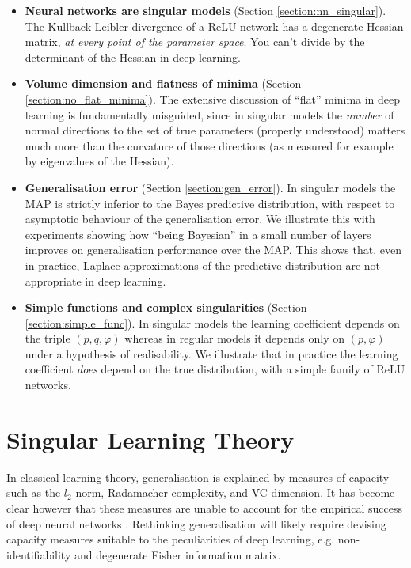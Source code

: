 \documentclass{article} %
\begin{document}
\begin{itemize}
    \item \textbf{Neural networks are singular models} (Section \ref{section:nn_singular}). The Kullback-Leibler divergence of a ReLU network has a degenerate Hessian matrix, \emph{at every point of the parameter space}. You can't divide by the determinant of the Hessian in deep learning.
    \item \textbf{Volume dimension and flatness of minima} (Section \ref{section:no_flat_minima}). The extensive discussion of ``flat'' minima in deep learning is fundamentally misguided, since in singular models the \emph{number} of normal directions to the set of true parameters (properly understood) matters much more than the curvature of those directions (as measured for example by eigenvalues of the Hessian).
    \item \textbf{Generalisation error} (Section \ref{section:gen_error}). In singular models the MAP is strictly inferior to the Bayes predictive distribution, with respect to asymptotic behaviour of the generalisation error. We illustrate this with experiments showing how ``being Bayesian'' in a small number of layers improves on generalisation performance over the MAP. This shows that, even in practice, Laplace approximations of the predictive distribution are not appropriate in deep learning.
    \item \textbf{Simple functions and complex singularities} (Section \ref{section:simple_func}). In singular models the learning coefficient depends on the triple $(p, q, \varphi)$ whereas in regular models it depends only on $(p, \varphi)$ under a hypothesis of realisability. We illustrate that in practice the learning coefficient \emph{does} depend on the true distribution, with a simple family of ReLU networks.
\end{itemize}

\section{Singular Learning Theory}

In classical learning theory, generalisation is explained by measures of capacity such as the $l_2$ norm, Radamacher complexity, and VC dimension. It has become clear however that these measures are unable to account for the empirical success of deep neural networks \citep{zhang_understanding_2017}. Rethinking generalisation will likely require devising capacity measures suitable to the peculiarities of deep learning, e.g. non-identifiability and degenerate Fisher information matrix. 
\end{document}
